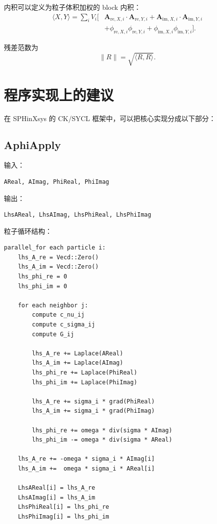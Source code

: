 \documentclass[UTF8,11pt]{ctexart}
\begin{document}
内积可以定义为粒子体积加权的 block 内积：
\begin{align}
    \langle X,Y\rangle
    =
    \sum_i V_i
    \Big[
    &\bm A_{\mathrm{re},X,i}\cdot\bm A_{\mathrm{re},Y,i}
    +
    \bm A_{\mathrm{im},X,i}\cdot\bm A_{\mathrm{im},Y,i}
    \nonumber\\
    &+
    \phi_{\mathrm{re},X,i}\phi_{\mathrm{re},Y,i}
    +
    \phi_{\mathrm{im},X,i}\phi_{\mathrm{im},Y,i}
    \Big].
\end{align}

残差范数为
\begin{equation}
    \|R\|
    =
    \sqrt{\langle R,R\rangle}.
\end{equation}

\section{程序实现上的建议}

在 SPHinXsys 的 CK/SYCL 框架中，可以把核心实现分成以下部分：

\subsection{AphiApply}

输入：
\begin{lstlisting}
AReal, AImag, PhiReal, PhiImag
\end{lstlisting}

输出：
\begin{lstlisting}
LhsAReal, LhsAImag, LhsPhiReal, LhsPhiImag
\end{lstlisting}

粒子循环结构：
\begin{lstlisting}
parallel_for each particle i:
    lhs_A_re = Vecd::Zero()
    lhs_A_im = Vecd::Zero()
    lhs_phi_re = 0
    lhs_phi_im = 0

    for each neighbor j:
        compute c_nu_ij
        compute c_sigma_ij
        compute G_ij

        lhs_A_re += Laplace(AReal)
        lhs_A_im += Laplace(AImag)
        lhs_phi_re += Laplace(PhiReal)
        lhs_phi_im += Laplace(PhiImag)

        lhs_A_re += sigma_i * grad(PhiReal)
        lhs_A_im += sigma_i * grad(PhiImag)

        lhs_phi_re += omega * div(sigma * AImag)
        lhs_phi_im -= omega * div(sigma * AReal)

    lhs_A_re += -omega * sigma_i * AImag[i]
    lhs_A_im +=  omega * sigma_i * AReal[i]

    LhsAReal[i] = lhs_A_re
    LhsAImag[i] = lhs_A_im
    LhsPhiReal[i] = lhs_phi_re
    LhsPhiImag[i] = lhs_phi_im
\end{lstlisting}
\end{document}

